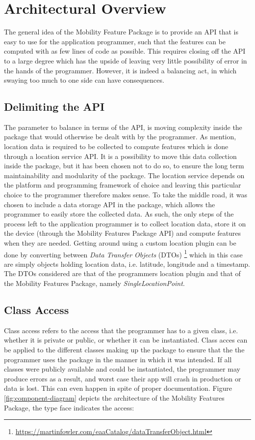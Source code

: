 \section{Architectural Overview}
The general idea of the Mobility Feature Package is to provide an API that is easy to use for the application programmer, such that the features can be computed with as few lines of code as possible. This requires closing off the API to a large degree which has the upside of leaving very little possibility of error in the hands of the programmer. However, it is indeed a balancing act, in which swaying too much to one side can have consequences. 

\subsection{Delimiting the API}
The parameter to balance in terms of the API, is moving complexity inside the package that would otherwise be dealt with by the programmer. As mention, location data is required to be collected to compute features which is done through a location service API. It is a possibility to move this data collection inside the package, but it has been chosen not to do so, to ensure the long term maintainability and modularity of the package. The location service depends on the platform and programming framework of choice and leaving this particular choice to the programmer therefore makes sense. To take the middle road, it was chosen to include a data storage API in the package, which allows the programmer to easily store the collected data. As such, the only steps of the process left to the application programmer is to collect location data, store it on the device (through the Mobility Features Package API) and compute features when they are needed. Getting around using a custom location plugin can be done by converting between \textit{Data Transfer Objects} (DTOs) \footnote{\url{https://martinfowler.com/eaaCatalog/dataTransferObject.html}} which in this case are simply objects holding location data, i.e. latitude, longitude and a timestamp. The DTOs considered are that of the programmers location plugin and that of the Mobility Features Package, namely \textit{SingleLocationPoint}.

\subsection{Class Access}
 Class access refers to the access that the programmer has to a given class, i.e. whether it is private or public, or whether it can be instantiated. Class acces can be applied to the different classes making up the package to ensure that the the programmer uses the package in the manner in which it was intended. If all classes were publicly available and could be instantiated, the programmer may produce errors as a result, and worst case their app will crash in production or data is lost. This can even happen in spite of proper documentation. Figure \ref{fig:component-diagram} depicts the architecture of the Mobility Features Package, the type face indicates the access: 
 
